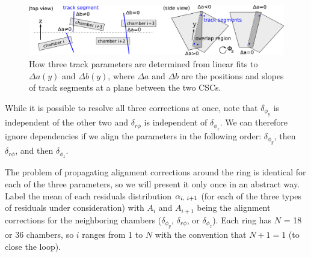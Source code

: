 \begin{figure}
\includegraphics[width=\linewidth]{plots/csc_overlaps_alignment/explanatory_diagram.pdf}
\caption{How three track parameters are determined from linear fits to $\Delta a(y)$ and $\Delta b(y)$, where $\Delta a$ and $\Delta b$ are the positions and slopes of track segments at a plane between the two CSCs.  \label{fig:overlaps_parameters}}
\end{figure}

While it is possible to resolve all three corrections at once, note
that $\delta_{\phi_y}$ is independent of the other two and
$\delta_{r\phi}$ is independent of $\delta_{\phi_z}$.  We can
therefore ignore dependencies if we align the parameters in the
following order: $\delta_{\phi_y}$, then $\delta_{r\phi}$, and then
$\delta_{\phi_z}$.

The problem of propagating alignment corrections around the ring is
identical for each of the three parameters, so we will present it only
once in an abstract way.  Label the mean of each residuals
distribution $\alpha_{i\mbox{\scriptsize, }i+1}$ (for each of the
three types of residuals under consideration) with $A_i$ and $A_{i+1}$
being the alignment corrections for the neighboring chambers
($\delta_{\phi_y}$, $\delta_{r\phi}$, or $\delta_{\phi_z}$).  Each
ring has $N$ = 18 or 36 chambers, so $i$ ranges from 1 to $N$ with the
convention that $N+1 = 1$ (to close the loop).

